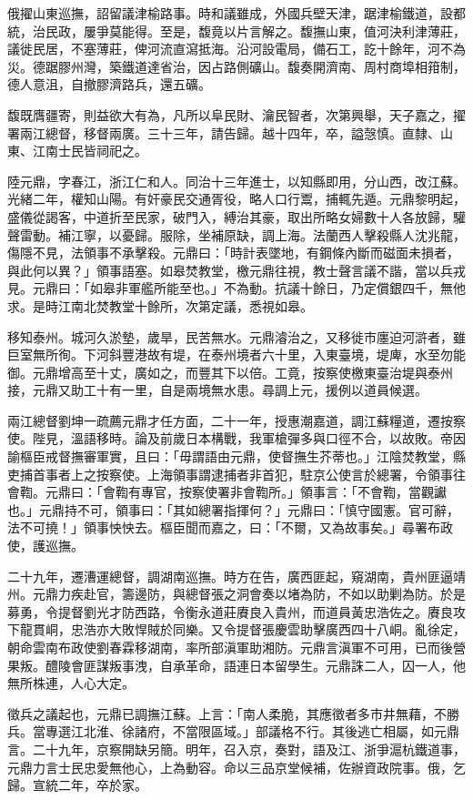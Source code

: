 \begin{pinyinscope}
俄擢山東巡撫，詔留議津榆路事。時和議雖成，外國兵壁天津，踞津榆鐵道，設都統，治民政，屢爭莫能得。至是，馥竟以片言解之。馥撫山東，值河決利津薄莊，議徙民居，不塞薄莊，俾河流直瀉抵海。沿河設電局，備石工，訖十餘年，河不為災。德踞膠州灣，築鐵道達省治，因占路側礦山。馥奏開濟南、周村商埠相箝制，德人意沮，自撤膠濟路兵，還五礦。

馥既膺疆寄，則益欲大有為，凡所以阜民財、瀹民智者，次第興舉，天子嘉之，擢署兩江總督，移督兩廣。三十三年，請告歸。越十四年，卒，謚愨慎。直隸、山東、江南士民皆祠祀之。

陸元鼎，字春江，浙江仁和人。同治十三年進士，以知縣即用，分山西，改江蘇。光緒二年，權知山陽。有奸豪民交通胥役，略人口行鬻，捕輒先遁。元鼎黎明起，盛儀從謁客，中道折至民家，破門入，縛治其豪，取出所略女婦數十人各放歸，驩聲雷動。補江寧，以憂歸。服除，坐補原缺，調上海。法蘭西人擊殺縣人沈兆龍，傷隱不見，法領事不承擊殺。元鼎曰：「時計表墜地，有鋼條內斷而磁面未損者，與此何以異？」領事語塞。如皋焚教堂，檄元鼎往視，教士聲言議不諧，當以兵戎見。元鼎曰：「如皋非軍艦所能至也。」不為動。抗議十餘日，乃定償銀四千，無他求。是時江南北焚教堂十餘所，次第定議，悉視如皋。

移知泰州。城河久淤墊，歲旱，民苦無水。元鼎濬治之，又移徙市廛迫河滸者，雖巨室無所徇。下河斜豐港故有堤，在泰州境者六十里，入東臺境，堤庳，水至勿能御。元鼎增高至十丈，廣如之，而豐其下以倍。工竟，按察使檄東臺治堤與泰州接，元鼎又助工十有一里，自是兩境無水患。尋調上元，援例以道員候選。

兩江總督劉坤一疏薦元鼎才任方面，二十一年，授惠潮嘉道，調江蘇糧道，遷按察使。陛見，溫語移時。論及前歲日本構戰，我軍槍彈多與口徑不合，以故敗。帝因諭樞臣戒督撫審軍實，且曰：「毋謂語由元鼎，使督撫生芥蒂也。」江陰焚教堂，縣吏捕首事者上之按察使。上海領事謂逮捕者非首犯，駐京公使言於總署，令領事往會鞫。元鼎曰：「會鞫有專官，按察使署非會鞫所。」領事言：「不會鞫，當觀讞也。」元鼎持不可，領事曰：「其如總署指揮何？」元鼎曰：「慎守國憲。官可辭，法不可撓！」領事怏怏去。樞臣聞而嘉之，曰：「不爾，又為故事矣。」尋署布政使，護巡撫。

二十九年，遷漕運總督，調湖南巡撫。時方在告，廣西匪起，窺湖南，貴州匪逼靖州。元鼎力疾赴官，籌邊防，與總督張之洞會奏以堵為防，不如以助剿為防。於是募勇，令提督劉光才防西路，令衡永道莊賡良入貴州，而道員黃忠浩佐之。賡良攻下龍貫峒，忠浩亦大敗悍賊於同樂。又令提督張慶雲助擊廣西四十八峒。亂徐定，朝命雲南布政使劉春霖移湖南，率所部滇軍助湘防。元鼎言滇軍不可用，已而後營果叛。醴陵會匪謀叛事洩，自承革命，語連日本留學生。元鼎誅二人，囚一人，他無所株連，人心大定。

徵兵之議起也，元鼎已調撫江蘇。上言：「南人柔脆，其應徵者多市井無藉，不勝兵。當專選江北淮、徐諸府，不當限區域。」部議格不行。其後逃亡相屬，如元鼎言。二十九年，京察開缺另簡。明年，召入京，奏對，語及江、浙爭滬杭鐵道事，元鼎力言士民忠愛無他心，上為動容。命以三品京堂候補，佐辦資政院事。俄，乞歸。宣統二年，卒於家。


\end{pinyinscope}
